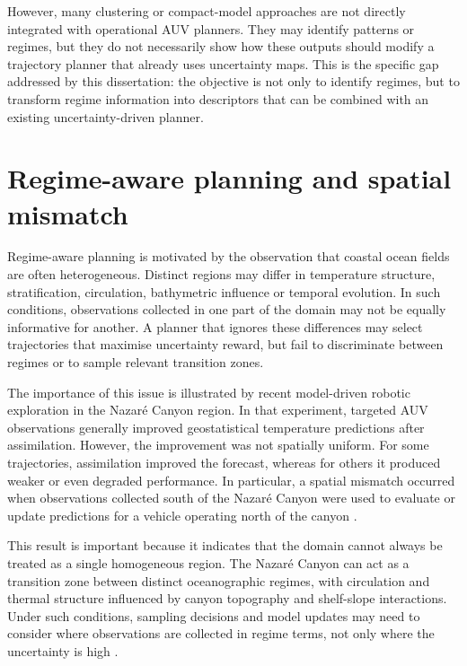 However, many clustering or compact-model approaches are not directly integrated with operational AUV planners. They may identify patterns or regimes, but they do not necessarily show how these outputs should modify a trajectory planner that already uses uncertainty maps. This is the specific gap addressed by this dissertation: the objective is not only to identify regimes, but to transform regime information into descriptors that can be combined with an existing uncertainty-driven planner.

\section{Regime-aware planning and spatial mismatch} \label{sec:rw_regime_spatial_mismatch}

Regime-aware planning is motivated by the observation that coastal ocean fields are often heterogeneous. Distinct regions may differ in temperature structure, stratification, circulation, bathymetric influence or temporal evolution. In such conditions, observations collected in one part of the domain may not be equally informative for another. A planner that ignores these differences may select trajectories that maximise uncertainty reward, but fail to discriminate between regimes or to sample relevant transition zones.

The importance of this issue is illustrated by recent model-driven robotic exploration in the Nazaré Canyon region. In that experiment, targeted AUV observations generally improved geostatistical temperature predictions after assimilation. However, the improvement was not spatially uniform. For some trajectories, assimilation improved the forecast, whereas for others it produced weaker or even degraded performance. In particular, a spatial mismatch occurred when observations collected south of the Nazaré Canyon were used to evaluate or update predictions for a vehicle operating north of the canyon \parencite{mendes2025oceanmodeldriven}.

This result is important because it indicates that the domain cannot always be treated as a single homogeneous region. The Nazaré Canyon can act as a transition zone between distinct oceanographic regimes, with circulation and thermal structure influenced by canyon topography and shelf-slope interactions. Under such conditions, sampling decisions and model updates may need to consider where observations are collected in regime terms, not only where the uncertainty is high \parencite{mendes2025oceanmodeldriven}.

